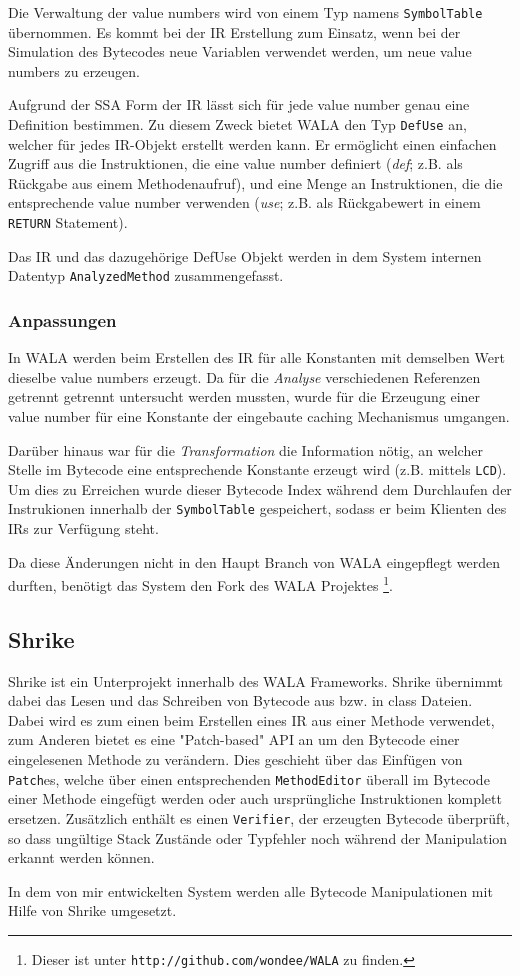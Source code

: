 Die Verwaltung der value numbers wird von einem Typ namens \texttt{SymbolTable} übernommen. Es kommt bei der
IR Erstellung zum Einsatz, wenn bei der Simulation des Bytecodes neue Variablen verwendet werden, um neue 
value numbers zu erzeugen.

Aufgrund der SSA Form der IR lässt sich für jede value number genau eine Definition bestimmen. Zu diesem 
Zweck bietet WALA den Typ \texttt{DefUse} an, welcher für jedes IR-Objekt erstellt werden kann. Er ermöglicht
einen einfachen Zugriff aus die Instruktionen, die eine value number definiert (\textit{def}; z.B. als 
Rückgabe aus einem Methodenaufruf), und eine Menge an Instruktionen, die die entsprechende value number 
verwenden (\textit{use}; z.B. als Rückgabewert in einem \texttt{RETURN} Statement).
   
Das IR und das dazugehörige DefUse Objekt werden in dem System internen Datentyp \texttt{AnalyzedMethod} 
zusammengefasst.


\subsubsection{Anpassungen}

In WALA werden beim Erstellen des IR für alle Konstanten mit demselben Wert dieselbe value numbers erzeugt. 
Da für die \textit{Analyse} verschiedenen Referenzen getrennt getrennt untersucht werden mussten, wurde 
für die Erzeugung einer value number für eine Konstante der eingebaute caching Mechanismus umgangen. 

Darüber hinaus war für die \textit{Transformation} die Information nötig, an welcher Stelle im Bytecode eine
entsprechende Konstante erzeugt wird (z.B. mittels \texttt{LCD}). Um dies zu Erreichen wurde dieser Bytecode 
Index während dem Durchlaufen der Instrukionen innerhalb der \texttt{SymbolTable} gespeichert, sodass er 
beim Klienten des IRs zur Verfügung steht.

Da diese Änderungen nicht in den Haupt Branch von WALA eingepflegt werden durften, benötigt das System den 
Fork des WALA Projektes \footnote{Dieser ist unter \texttt{http://github.com/wondee/WALA} zu finden.}.


\subsection{Shrike}

Shrike ist ein Unterprojekt innerhalb des WALA Frameworks. Shrike übernimmt dabei das Lesen und das 
Schreiben von Bytecode aus bzw. in class Dateien. Dabei wird es zum einen beim Erstellen eines IR aus einer 
Methode verwendet, zum Anderen bietet es eine "Patch-based" API an um den Bytecode einer eingelesenen 
Methode zu verändern. Dies geschieht über das Einfügen von \texttt{Patch}es, welche über einen 
entsprechenden \texttt{MethodEditor} überall im Bytecode einer Methode eingefügt werden oder auch 
ursprüngliche Instruktionen komplett ersetzen. Zusätzlich enthält es einen \texttt{Verifier}, der erzeugten 
Bytecode überprüft, so dass ungültige Stack Zustände oder Typfehler noch während der Manipulation erkannt 
werden können. 

In dem von mir entwickelten System werden alle Bytecode Manipulationen mit Hilfe von Shrike umgesetzt. 

